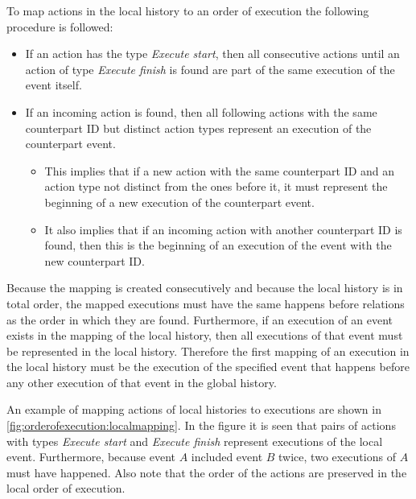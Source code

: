 	\newpar To map actions in the local history to an order of execution the following procedure is followed:

	\begin{itemize}
		\item If an action has the type \textit{Execute start}, then all consecutive actions until an action of type \textit{Execute finish} is found are part of the same execution of the event itself.
		\item If an incoming action is found, then all following actions with the same counterpart ID but distinct action types represent an execution of the counterpart event.
		\begin{itemize}
			\item This implies that if a new action with the same counterpart ID and an action type not distinct from the ones before it, it must represent the beginning of a new execution of the counterpart event.
			\item It also implies that if an incoming action with another counterpart ID is found, then this is the beginning of an execution of the event with the new counterpart ID.
		\end{itemize}
	\end{itemize}
	
	\noindent Because the mapping is created consecutively and because the local history is in total order, the mapped executions must have the same happens before relations as the order in which they are found. Furthermore, if an execution of an event exists in the mapping of the local history, then all executions of that event must be represented in the local history. Therefore the first mapping of an execution in the local history must be the execution of the specified event that  happens before any other execution of that event in the global history.
	
	An example of mapping actions of local histories to executions are shown in \autoref{fig:orderofexecution:localmapping}. In the figure it is seen that pairs of actions with types \textit{Execute start} and \textit{Execute finish} represent executions of the local event. Furthermore, because event $A$ included event $B$ twice, two executions of $A$ must have happened. Also note that the order of the actions are preserved in the local order of execution.
	
